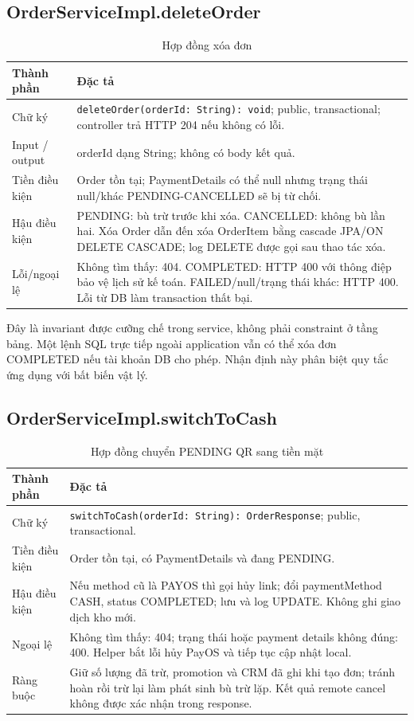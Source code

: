 \documentclass[12pt,a4paper,oneside]{report}
\begin{document}
\subsection{OrderServiceImpl.deleteOrder}
\begin{table}[htbp]
\centering\small
\caption{Hợp đồng xóa đơn}
\begin{tabularx}{\textwidth}{@{}p{3.1cm}Y@{}}\toprule
Thành phần & Đặc tả\\\midrule
Chữ ký & \texttt{deleteOrder(orderId: String): void}; public, transactional; controller trả HTTP 204 nếu không có lỗi.\\
Input / output & orderId dạng String; không có body kết quả.\\
Tiền điều kiện & Order tồn tại; PaymentDetails có thể null nhưng trạng thái null/khác PENDING-CANCELLED sẽ bị từ chối.\\
Hậu điều kiện & PENDING: bù trừ trước khi xóa. CANCELLED: không bù lần hai. Xóa Order dẫn đến xóa OrderItem bằng cascade JPA/ON DELETE CASCADE; log DELETE được gọi sau thao tác xóa.\\
Lỗi/ngoại lệ & Không tìm thấy: 404. COMPLETED: HTTP 400 với thông điệp bảo vệ lịch sử kế toán. FAILED/null/trạng thái khác: HTTP 400. Lỗi từ DB làm transaction thất bại.\\
\bottomrule\end{tabularx}
\end{table}

Đây là invariant được cưỡng chế trong service, không phải constraint ở tầng bảng. Một lệnh SQL trực tiếp ngoài application vẫn có thể xóa đơn COMPLETED nếu tài khoản DB cho phép. Nhận định này phân biệt quy tắc ứng dụng với bất biến vật lý.

\subsection{OrderServiceImpl.switchToCash}
\begin{table}[htbp]
\centering\small
\caption{Hợp đồng chuyển PENDING QR sang tiền mặt}
\begin{tabularx}{\textwidth}{@{}p{3.1cm}Y@{}}\toprule
Thành phần & Đặc tả\\\midrule
Chữ ký & \texttt{switchToCash(orderId: String): OrderResponse}; public, transactional.\\
Tiền điều kiện & Order tồn tại, có PaymentDetails và đang PENDING.\\
Hậu điều kiện & Nếu method cũ là PAYOS thì gọi hủy link; đổi paymentMethod CASH, status COMPLETED; lưu và log UPDATE. Không ghi giao dịch kho mới.\\
Ngoại lệ & Không tìm thấy: 404; trạng thái hoặc payment details không đúng: 400. Helper bắt lỗi hủy PayOS và tiếp tục cập nhật local.\\
Ràng buộc & Giữ số lượng đã trừ, promotion và CRM đã ghi khi tạo đơn; tránh hoàn rồi trừ lại làm phát sinh bù trừ lặp. Kết quả remote cancel không được xác nhận trong response.\\
\bottomrule\end{tabularx}
\end{table}
\end{document}
